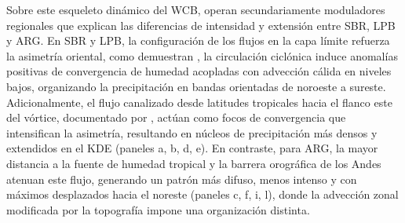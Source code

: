 Sobre este esqueleto dinámico del WCB, operan secundariamente moduladores regionales que explican las diferencias de intensidad y extensión entre SBR, LPB y ARG. En SBR y LPB, la configuración de los flujos en la capa límite refuerza la asimetría oriental, como demuestran \citet{cardoso2022synoptic}, la circulación ciclónica induce anomalías positivas de convergencia de humedad acopladas con advección cálida en niveles bajos, organizando la precipitación en bandas orientadas de noroeste a sureste. Adicionalmente, el flujo canalizado desde latitudes tropicales hacia el flanco este del vórtice, documentado por \citet{vera2002cold}, actúan como focos de convergencia que intensifican la asimetría, resultando en núcleos de precipitación más densos y extendidos en el KDE (paneles a, b, d, e). En contraste, para ARG, la mayor distancia a la fuente de humedad tropical y la barrera orográfica de los Andes atenuan este flujo, generando un patrón más difuso, menos intenso y con máximos desplazados hacia el noreste (paneles c, f, i, l), donde la advección zonal modificada por la topografía impone una organización distinta.

